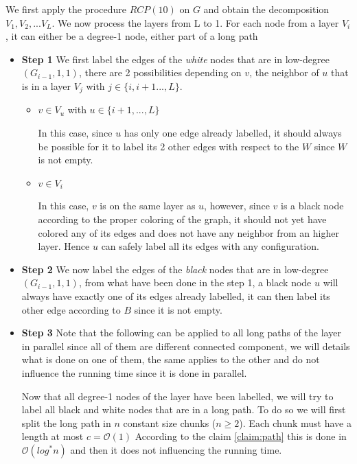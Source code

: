We first apply the procedure $RCP(10)$ on $G$ and obtain the decomposition $V_1,V_2,...V_L$. We now process the layers from L to 1.
For each node from a layer $V_i$, it can either be a degree-1 node, either part of a long path
\begin{itemize}

    \item \textbf{Step 1}
    We first label the edges of the \textit{white} nodes that are in low-degree$(G_{i-1},1,1)$, there are 2 possibilities depending on $v$, the neighbor of $u$ that is in a layer $V_j$ with $j \in \{i,i+1...,L\}$.
    \begin{itemize}
        \item $v \in V_u$ with $u \in \{i+1,...,L\}$
        
        In this case, since $u$ has only one edge already labelled, it should always be possible for it to label its 2 other edges with respect to the $W$ since $W$ is not empty.
        
        \item $v \in V_i$
        
        In this case, $v$ is on the same layer as $u$, however, since $v$ is a black node according to the proper coloring of the graph, it should not yet have colored any of its edges and does not have any neighbor from an higher layer. Hence $u$ can safely label all its edges with any configuration.
    \end{itemize}
    
    \item \textbf{Step 2}
    We now label the edges of the \textit{black} nodes that are in low-degree$(G_{i-1},1,1)$, from what have been done in the step 1, a black node $u$ will always have exactly one of its edges already labelled, it can then label its other edge according to $B$ since it is not empty.
    
    \item \textbf{Step 3}
    Note that the following can be applied to all long paths of the layer in parallel since all of them are different connected component, we will details what is done on one of them, the same applies to the other and do not influence the running time since it is done in parallel.
    
    Now that all degree-1 nodes of the layer have been labelled, we will try to label all black and white nodes that are in a long path. To do so we will first split the long path in $n$ constant size chunks ($n\geq 2$). Each chunk must have a length at most $c = \mathcal{O}(1)$ According to the claim \ref{claim:path} this is done in $\mathcal{O}(log^*n)$ and then it does not influencing the running time.
    

\end{itemize}

